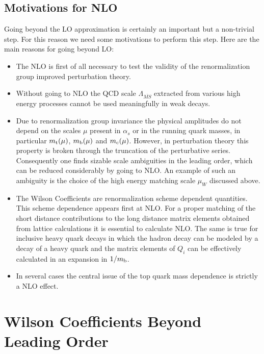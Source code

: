 \documentclass[12pt]{article}
\newcommand{\mt}{m_{\rm t}}
\newcommand{\mc}{m_{\rm c}}
\newcommand{\mb}{m_{\rm b}}
\begin{document}
\begin{itemize}
\begin{itemize}
\begin{itemize}
\subsection{Motivations for NLO}
Going beyond the LO approximation is certainly an important but a 
non-trivial step. For this reason we need some motivations to perform
this step. Here are the main reasons for going beyond LO:
\begin{itemize}
\item The NLO is first of all necessary to test the validity of
the renormalization group improved perturbation theory.
\item Without going to NLO the QCD scale $\Lambda_{\overline{MS}}$
extracted from various high energy processes cannot be used 
meaningfully in weak decays.
\item 
Due to renormalization group invariance the physical
amplitudes do not depend on the scales $\mu$ present in $\alpha_s$
or in the running quark masses, in particular $\mt(\mu)$, 
$\mb(\mu)$ and $\mc(\mu)$. However,
in perturbation theory this property is broken through the truncation
of the perturbative series. Consequently one finds sizable scale
ambiguities in the leading order, which can be reduced considerably
by going to NLO. An example of such an ambiguity is the choice of the
high energy matching scale $\mu_W$ discussed above.
\item
The Wilson Coefficients are renormalization scheme dependent quantities.
This scheme dependence appears first at NLO. For a proper matching of
the short distance contributions to the long distance matrix elements
obtained from lattice calculations it is essential to calculate NLO.
The same is true for inclusive heavy quark decays in which the hadron
decay can be modeled by a decay of a heavy quark and the matrix elements
of $Q_i$ can be effectively calculated in an expansion in $1/\mb$.
\item 
In several cases the central issue of the top quark mass dependence
is strictly a NLO effect.
\end{itemize}

\section{Wilson Coefficients Beyond Leading Order}
\setcounter{equation}{0}

\end{itemize}
\end{itemize}
\end{itemize}
\end{document}
